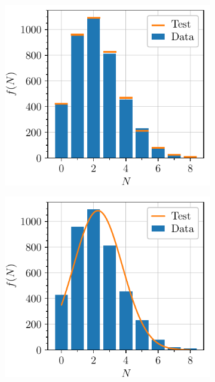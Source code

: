\begin{figure}[htbp]
    \centering
    \begin{subfigure}{0.495\textwidth}
        \includegraphics[scale=1]{figures/lowmean_poisson.pdf}
        \caption{}
    \end{subfigure}
    \hfill
    \begin{subfigure}{0.495\textwidth}
        \includegraphics[scale=1]{figures/lowmean_gaussian.pdf}
        \caption{}
    \end{subfigure}
    \begin{subfigure}{0.495\textwidth}

\end{subfigure}
\end{figure}
